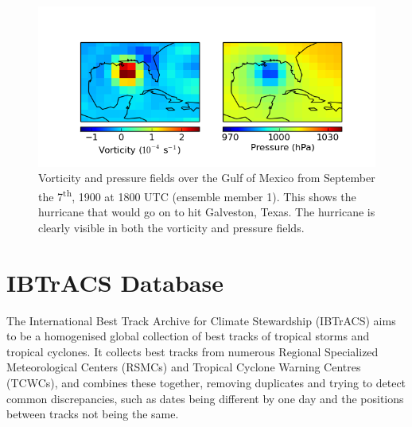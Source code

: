 \documentclass[pdftex,12pt,a4paper]{report}
\newcommand{\ts}{\textsuperscript}
\begin{document}
\begin{figure}[ht!]
    \centering
    \includegraphics[width=\textwidth]{figures/galveston_1900-9-7_18-00_em0}
    \caption{Vorticity and pressure fields over the Gulf of Mexico from September the 7\ts{th}, 1900
        at 1800 UTC (ensemble member 1). This shows the hurricane that would go on to hit
        Galveston, Texas. The hurricane is clearly visible in both the vorticity and pressure fields.}
    \label{fig:galveston}
\end{figure}


\section{IBTrACS Database}
\label{sec:ibtracs}
The International Best Track Archive for Climate Stewardship (IBTrACS)
\parencite{knappInternational2010} aims to be a homogenised global collection of best tracks of
tropical storms and tropical cyclones. It collects best tracks from numerous Regional Specialized
Meteorological Centers (RSMCs) and Tropical Cyclone Warning Centres (TCWCs), and combines these
together, removing duplicates and trying to detect common discrepancies, such as dates being different
by one day and the positions between tracks not being the same.
\end{document}
